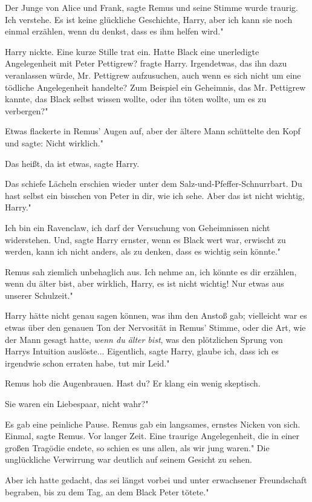 \glqq Der Junge von Alice und Frank\grqq{}, sagte Remus und seine Stimme wurde
traurig. \glqq Ich verstehe. Es ist keine glückliche Geschichte, Harry, aber ich
kann sie noch einmal erzählen, wenn du denkst, dass es ihm helfen wird."

Harry nickte. Eine kurze Stille trat ein. \glqq Hatte Black eine unerledigte
Angelegenheit mit Peter Pettigrew?\grqq{} fragte Harry. \glqq Irgendetwas, das
ihn dazu veranlassen würde, Mr. Pettigrew aufzusuchen, auch wenn es sich nicht
um eine tödliche Angelegenheit handelte? Zum Beispiel ein Geheimnis, das Mr.
Pettigrew kannte, das Black selbst wissen wollte, oder ihn töten wollte, um es
zu verbergen?"

Etwas flackerte in Remus' Augen auf, aber der ältere Mann schüttelte den Kopf
und sagte: \glqq Nicht wirklich."

\glqq Das heißt, da ist etwas\grqq{}, sagte Harry.

Das schiefe Lächeln erschien wieder unter dem Salz-und-Pfeffer-Schnurrbart.
\glqq Du hast selbst ein bisschen von Peter in dir, wie ich sehe. Aber das ist
nicht wichtig, Harry."

\glqq Ich bin ein Ravenclaw, ich darf der Versuchung von Geheimnissen nicht
widerstehen. Und\grqq{}, sagte Harry ernster, \glqq wenn es Black wert war,
erwischt zu werden, kann ich nicht anders, als zu denken, dass es wichtig sein
könnte."

Remus sah ziemlich unbehaglich aus. \glqq Ich nehme an, ich könnte es dir
erzählen, wenn du älter bist, aber wirklich, Harry, es ist nicht wichtig! Nur
etwas aus unserer Schulzeit."

Harry hätte nicht genau sagen können, was ihm den Anstoß gab; vielleicht war es
etwas über den genauen Ton der Nervosität in Remus' Stimme, oder die Art, wie
der Mann gesagt hatte, \emph{wenn du älter bist}, was den plötzlichen Sprung von
Harrys Intuition auslöste... \glqq Eigentlich\grqq{}, sagte Harry, \glqq glaube
ich, dass ich es irgendwie schon erraten habe, tut mir Leid."

Remus hob die Augenbrauen. \glqq Hast du?\grqq{} Er klang ein wenig skeptisch.

\glqq Sie waren ein Liebespaar, nicht wahr?"

Es gab eine peinliche Pause. Remus gab ein langsames, ernstes Nicken von sich.
\glqq Einmal\grqq{}, sagte Remus. \glqq Vor langer Zeit. Eine traurige
Angelegenheit, die in einer großen Tragödie endete, so schien es uns allen, als
wir jung waren." Die unglückliche Verwirrung war deutlich auf seinem Gesicht zu
sehen.

\glqq Aber ich hatte gedacht, das sei längst vorbei und unter erwachsener
Freundschaft begraben, bis zu dem Tag, an dem Black Peter tötete."

